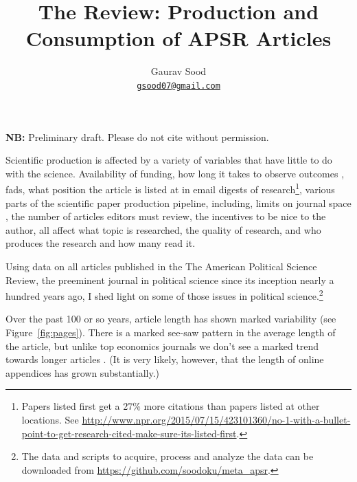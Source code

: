 \documentclass[11pt]{article}
\begin{document}
\title{\vspace{-1cm}\normalsize{\textbf{The Review: Production and Consumption of APSR Articles}}}
\author{Gaurav Sood\\\small{\href{mailto:gsood07@gmail.com}{\tt{gsood07@gmail.com}}}}
\maketitle
\begin{center}
\vspace{-.5cm}\textbf{NB:} Preliminary draft. Please do not cite without permission.
\end{center}
\vspace{.2cm}
\doublespacing

Scientific production is affected by a variety of variables that have little to do with the science. Availability of funding, how long it takes to observe outcomes \citep{budish2013firms}, fads, what position the article is listed at in email digests of research\footnote{Papers listed first get a 27\% more citations than papers listed at other locations. See \href{http://www.npr.org/2015/07/15/423101360/no-1-with-a-bullet-point-to-get-research-cited-make-sure-its-listed-first}{http://www.npr.org/2015/07/15/423101360/no-1-with-a-bullet-point-to-get-research-cited-make-sure-its-listed-first}.}, various parts of the scientific paper production pipeline, including, limits on journal space \citep{card2014page}, the number of articles editors must review, the incentives to be nice to the author, all affect what topic is researched, the quality of research, and who produces the research and how many read it. 

Using data on all articles published in the The American Political Science Review, the preeminent journal in political science since its inception nearly a hundred years ago, I shed light on some of those issues in political science.\footnote{The data and scripts to acquire, process and analyze the data can be downloaded from \href{https://github.com/soodoku/meta_apsr}{https://github.com/soodoku/meta\_apsr}.} 

Over the past 100 or so years, article length has shown marked variability (see Figure~\ref{fig:pages}). There is a marked see-saw pattern in the average length of the article, but unlike top economics journals we don't see a marked trend towards longer articles \citep{card2013nine, card2014page}. (It is very likely, however, that the length of online appendices has grown substantially.)
\end{document}
